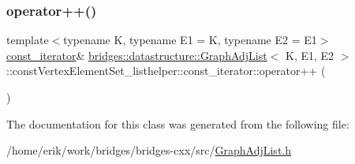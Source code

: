 \subsubsection{\texorpdfstring{operator++()}{operator++()}}
{\footnotesize\ttfamily template$<$typename K, typename E1 = K, typename E2 = E1$>$ \\
\hyperlink{classbridges_1_1datastructure_1_1_graph_adj_list_1_1const_vertex_element_set__listhelper_1_1const__iterator}{const\+\_\+iterator}\& \hyperlink{classbridges_1_1datastructure_1_1_graph_adj_list}{bridges\+::datastructure\+::\+Graph\+Adj\+List}$<$ K, E1, E2 $>$\+::const\+Vertex\+Element\+Set\+\_\+listhelper\+::const\+\_\+iterator\+::operator++ (\begin{DoxyParamCaption}{ }\end{DoxyParamCaption})\hspace{0.3cm}{\ttfamily [inline]}}



The documentation for this class was generated from the following file\+:\begin{DoxyCompactItemize}
\item 
/home/erik/work/bridges/bridges-\/cxx/src/\hyperlink{_graph_adj_list_8h}{Graph\+Adj\+List.\+h}\end{DoxyCompactItemize}
